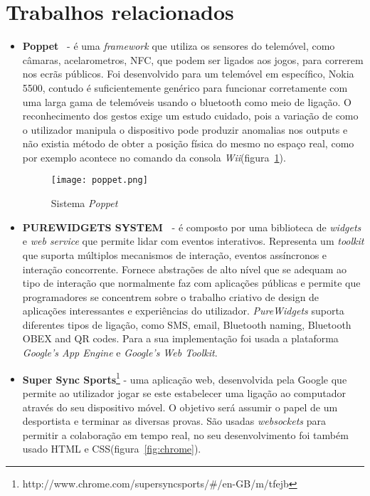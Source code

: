 \section{Trabalhos relacionados}
\begin{itemize}
\item \textbf{Poppet}~\cite{Vajk2008b} - é uma \textit{framework} que utiliza os sensores do telemóvel, como câmaras, acelarometros, NFC, que podem ser ligados aos jogos, para correrem nos ecrãs públicos. Foi desenvolvido para um telemóvel em específico, Nokia 5500, contudo é suficientemente genérico para funcionar corretamente com uma larga gama de telemóveis usando o bluetooth como meio de ligação. O reconhecimento dos gestos exige um estudo cuidado, pois a variação de como o utilizador manipula o dispositivo pode produzir anomalias nos outputs e não existia método de obter a posição física do mesmo no espaço real, como por exemplo acontece no comando da consola \textit{Wii}(figura~\ref{fig:poppet}).

\begin{figure}[ht]
\centering
\texttt{[image: poppet.png]}
\caption[Sistema \textit{Poppet}] {Sistema \textit{Poppet}~\cite{Vajk2008b}}
\label{fig:poppet}
\end{figure}

\item \textbf{PUREWIDGETS SYSTEM~\cite{Cardoso2012g}} - é composto por uma biblioteca de \textit{widgets} e \textit{web service} que permite lidar com eventos interativos. Representa um \textit{toolkit} que suporta múltiplos mecanismos de interação, eventos assíncronos e interação concorrente. Fornece abstrações de alto nível que se adequam ao tipo de interação que normalmente faz com aplicações públicas e permite que programadores se concentrem sobre o trabalho criativo de design de aplicações interessantes e experiências do utilizador. \textit{PureWidgets} suporta diferentes tipos de ligação, como SMS, email, Bluetooth naming, Bluetooth OBEX and QR codes. Para a sua implementação foi usada a plataforma \textit{Google’s App Engine} e \textit{Google’s Web Toolkit}.


\item \textbf{Super Sync Sports}\footnote{http://www.chrome.com/supersyncsports/\#/en-GB/m/tfejb} -  uma aplicação web, desenvolvida pela Google que permite ao utilizador jogar se este estabelecer uma ligação ao computador através do seu dispositivo móvel. O objetivo será assumir o papel de um desportista e terminar as diversas provas. São usadas \textit{websockets} para permitir a colaboração em tempo real, no seu desenvolvimento foi também usado HTML e CSS(figura~\ref{fig:chrome}).


\end{itemize}
